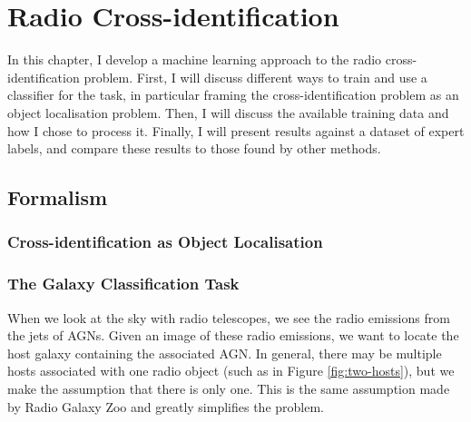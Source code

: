 
\chapter{Radio Cross-identification}
\label{cha:passive-learning}

  In this chapter, I develop a machine learning approach to the radio cross-identification problem. First, I will discuss different ways to train and use a classifier for the task, in particular framing the cross-identification problem as an object localisation problem. Then, I will discuss the available training data and how I chose to process it. Finally, I will present results against a dataset of expert labels, and compare these results to those found by other methods.

\section{Formalism}
\label{sec:cross-identification-formalism}
  


  \subsection{Cross-identification as Object Localisation}
  \label{sec:object-localisation}

  \subsection{The Galaxy Classification Task}
  \label{sec:galaxy-classification-task}

  
  When we look at the sky with radio telescopes, we see the radio emissions from
  the jets of AGNs.  Given an image of these radio
  emissions, we want to locate the host galaxy containing the associated AGN. In
  general, there may be multiple hosts associated with one radio object (such as
  in Figure \ref{fig:two-hosts}), but we make the assumption that there is only
  one. This is the same assumption made by Radio Galaxy Zoo  and greatly simplifies the problem.

